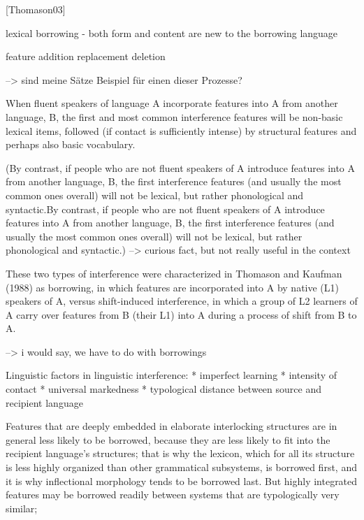 
[Thomason03]

lexical borrowing - both form and content are new to the borrowing language

feature addition
        replacement
        deletion

--> sind meine Sätze Beispiel für einen dieser Prozesse?

When fluent speakers of language A incorporate features into A
from another language, B, the first and most common interference features
will be non-basic lexical items, followed (if contact is sufficiently intense) by
structural features and perhaps also basic vocabulary.

(By contrast, if people who are not fluent speakers of A introduce features
into A from another language, B, the first interference features (and usually
the most common ones overall) will not be lexical, but rather phonological and
syntactic.By contrast, if people who are not fluent speakers of A introduce features
into A from another language, B, the first interference features (and usually
the most common ones overall) will not be lexical, but rather phonological and
syntactic.) --> curious fact, but not really useful in the context

These two types of interference were characterized in Thomason and
Kaufman (1988) as borrowing, in which features are incorporated into A by
native (L1) speakers of A, versus shift-induced interference, in which a group of
L2 learners of A carry over features from B (their L1) into A during a process
of shift from B to A.

--> i would say, we have to do with borrowings

Linguistic factors in linguistic interference:
* imperfect learning
* intensity of contact
* universal markedness
* typological distance between source and recipient language

Features that
are deeply embedded in elaborate interlocking structures are in general less
likely to be borrowed, because they are less likely to fit into the recipient
language’s structures; that is why the lexicon, which for all its structure is less
highly organized than other grammatical subsystems, is borrowed first, and it
is why inflectional morphology tends to be borrowed last. But highly integrated
features may be borrowed readily between systems that are typologically very
similar;

